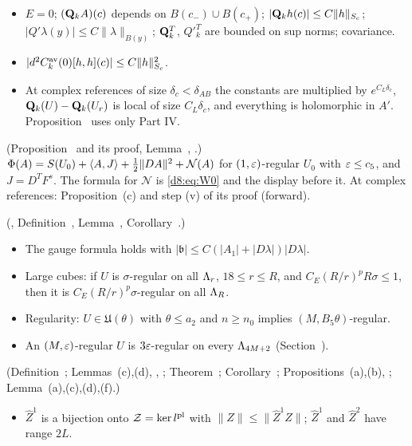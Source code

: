 \begin{description}[style=unboxed,leftmargin=0.8em]
  \begin{itemize}
  \item $E=0$; $(\mathbf Q_kA)(c)$ depends on $B(c_-)\cup B(c_+)$; $|\mathbf Q_kh(c)|\le C\|h\|_{S_c}$; $|Q'\lambda(y)|\le C\|\lambda\|_{B(y)}$; $\mathbf Q^T_k$, $Q'^T_k$ are bounded on sup norms; covariance.
  \item $|d^2C^{\rm av}_k(0)[h,h](c)|\le C\|h\|^2_{S_c}$.
  \item At complex references of size $\delta_c<\delta_{AB}$ the constants are multiplied by $e^{C_L\delta_c}$, $\mathbf Q_k(U)-\mathbf Q_k(U_r)$ is local of size $C_L\delta_c$, and everything is holomorphic in $A'$. Proposition~ uses only Part IV.
  \end{itemize}
\item[I10. Action] (Proposition~ and its proof, Lemma~, .) $\Phi(A)=S(U_0)+\langle A,J\rangle+\frac12\|DA\|^2+\mathcal N(A)$ for $(1,\varepsilon)$-regular $U_0$ with $\varepsilon\le c_5$, and $J=D^TF^s$. The formula for $\mathcal N$ is \eqref{d8:eq:W0} and the display before it. At complex references: Proposition~(c) and step (v) of its proof (forward).
\item[I11. Chart and gauges] (, Definition~, Lemma~, Corollary~.)
  \begin{itemize}
  \item The gauge formula holds with $|\mathfrak b|\le C(|A_1|+|D\lambda|)|D\lambda|$.
  \item Large cubes: if $U$ is $\sigma$-regular on all $\Lambda_r$, $18\le r\le R$, and $C_E(R/r)^pR\sigma\le1$, then it is $C_E(R/r)^p\sigma$-regular on all $\Lambda_R$.
  \item Regularity: $U\in\mathfrak U(\theta)$ with $\theta\le a_2$ and $n\ge n_0$ implies $(M,B_5\theta)$-regular.
  \item An $(M,\varepsilon)$-regular $U$ is $3\varepsilon$-regular on every $\Lambda_{4M+2}$ (Section~).
  \end{itemize}
\item[I12. The step of Part VII] (Definition~; Lemmas~(c),(d), , ; Theorem~; Corollary~; Propositions~(a),(b), ; Lemma~(a),(c),(d),(f).)
  \begin{itemize}
  \item $\hat Z^1$ is a bijection onto $\mathcal Z=\ker l^{\rm pl}$ with $\|Z\|\le\|\hat Z^1Z\|$; $\hat Z^1$ and $\hat Z^2$ have range $2L$.

\end{itemize}
\end{description}
